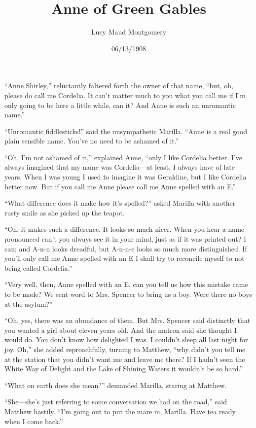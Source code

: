 \documentclass[a4paper]{article}
\title{Anne of Green Gables}
\author{Lucy Maud Montgomery}
\date{06/13/1908}
\begin{document}
\maketitle


``Anne Shirley,'' reluctantly faltered forth the owner of that name, ``but, oh, please do call me Cordelia. It can't matter much to you what you call me if I'm only going to be here a little while, can it? And Anne is such an unromantic name.''

``Unromantic fiddlesticks!'' said the unsympathetic Marilla. ``Anne is a real good plain sensible name. You've no need to be ashamed of it.''

``Oh, I'm not ashamed of it,'' explained Anne, ``only I like Cordelia better. I've always imagined that my name was Cordelia---at least, I always have of late years. When I was young I used to imagine it was Geraldine, but I like Cordelia better now. But if you call me Anne please call me Anne spelled with an E.''

``What difference does it make how it's spelled?'' asked Marilla with another rusty smile as she picked up the teapot.

``Oh, it makes such a difference. It looks so much nicer. When you hear a name pronounced can't you always see it in your mind, just as if it was printed out? I can; and A-n-n looks dreadful, but A-n-n-e looks so much more distinguished. If you'll only call me Anne spelled with an E I shall try to reconcile myself to not being called Cordelia.''

``Very well, then, Anne spelled with an E, can you tell us how this mistake came to be made? We sent word to Mrs. Spencer to bring us a boy. Were there no boys at the asylum?''

``Oh, yes, there was an abundance of them. But Mrs. Spencer said distinctly that you wanted a girl about eleven years old. And the matron said she thought I would do. You don't know how delighted I was. I couldn't sleep all last night for joy. Oh,'' she added reproachfully, turning to Matthew, ``why didn't you tell me at the station that you didn't want me and leave me there? If I hadn't seen the White Way of Delight and the Lake of Shining Waters it wouldn't be so hard.''

``What on earth does she mean?'' demanded Marilla, staring at Matthew.

``She---she's just referring to some conversation we had on the road,'' said Matthew hastily. ``I'm going out to put the mare in, Marilla. Have tea ready when I come back.''
\end{document}

